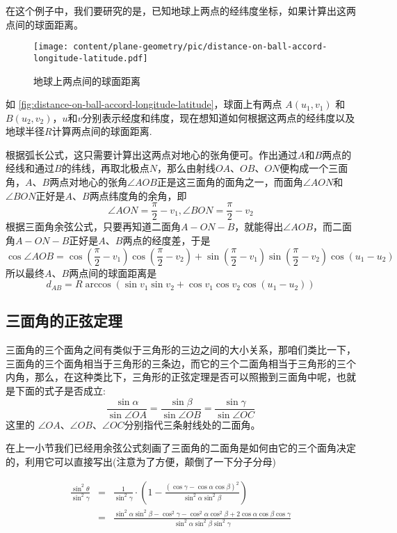 \begin{example}[根据经纬度计算地球上两点间的(球面)距离]
  在这个例子中，我们要研究的是，已知地球上两点的经纬度坐标，如果计算出这两点间的球面距离。

  \begin{figure}[htbp]
\centering
\texttt{[image: content/plane-geometry/pic/distance-on-ball-accord-longitude-latitude.pdf]}
\caption{地球上两点间的球面距离}
\label{fig:distance-on-ball-accord-longitude-latitude}
\end{figure}

如 \autoref{fig:distance-on-ball-accord-longitude-latitude}，球面上有两点 $A(u_1, v_1)$ 和 $B(u_2,v_2)$，$u$和$v$分别表示经度和纬度，现在想知道如何根据这两点的经纬度以及地球半径$R$计算两点间的球面距离.

根据弧长公式，这只需要计算出这两点对地心的张角便可。作出通过$A$和$B$两点的经线和通过$B$的纬线，再取北极点$N$，那么由射线$OA$、$OB$、$ON$便构成一个三面角，$A$、$B$两点对地心的张角$\angle AOB$正是这三面角的面角之一，而面角$\angle AON$和$\angle BON$正好是$A$、$B$两点纬度角的余角，即
\[ \angle AON = \frac{\pi}{2}-v_1, \angle BON = \frac{\pi}{2}-v_2 \]
根据三面角余弦公式，只要再知道二面角$A-ON-B$，就能得出$\angle AOB$，而二面角$A-ON-B$正好是$A、B$两点的经度差，于是
\[ \cos{\angle AOB} = \cos{\left(\frac{\pi}{2}-v_1\right)}\cos{\left(\frac{\pi}{2}-v_2\right)}+\sin{\left( \frac{\pi}{2}-v_1 \right)}\sin{\left(\frac{\pi}{2}-v_2\right)}\cos{(u_1-u_2)} \]
所以最终$A$、$B$两点间的球面距离是
\[ d_{AB} = R\arccos(\sin{v_1}\sin{v_2}+\cos{v_1}\cos{v_2}\cos{(u_1-u_2)}) \]
\end{example}

\subsection{三面角的正弦定理}
\label{sec:sine-thoream-of-trihedral-angle}

三面角的三个面角之间有类似于三角形的三边之间的大小关系，那咱们类比一下，三面角的三个面角相当于三角形的三条边，而它的三个二面角相当于三角形的三个内角，那么，在这种类比下，三角形的正弦定理是否可以照搬到三面角中呢，也就是下面的式子是否成立:
\[ \frac{\sin{\alpha}}{\sin{\angle OA}} = \frac{\sin{\beta}}{\sin{\angle OB}} = \frac{\sin{\gamma}}{\sin{\angle OC}} \]
这里的 $\angle OA$、$\angle OB$、$\angle OC$分别指代三条射线处的二面角。

在上一小节我们已经用余弦公式刻画了三面角的二面角是如何由它的三个面角决定的，利用它可以直接写出(注意为了方便，颠倒了一下分子分母)

\begin{eqnarray*}
  \frac{\sin^{2}{\theta}}{\sin^2{\gamma}} & = & \frac{1}{\sin^2{\gamma}} \cdot \left( 1-\frac{(\cos{\gamma}-\cos{\alpha}\cos{\beta})^2}{\sin^2{\alpha}\sin^2{\beta}} \right) \\
  & = & \frac{\sin^2{\alpha}\sin^2{\beta}-\cos^2{\gamma}-\cos^2{\alpha}\cos^2{\beta}+2\cos{\alpha}\cos{\beta}\cos{\gamma}}{\sin^2{\alpha}\sin^2{\beta}\sin^2{\gamma}} 
\end{eqnarray*}


